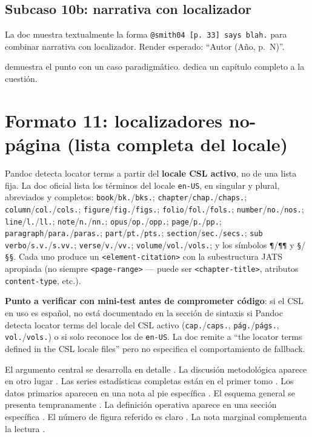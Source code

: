 \documentclass{article}
\begin{document}
\subsection{Subcaso 10b: narrativa con localizador}
La doc muestra textualmente la forma \texttt{@smith04 [p. 33] says blah.} para combinar narrativa con localizador. Render esperado: “Autor (Año, p. N)”.

\textcite[p. 33]{2961-KACZAN2016} demuestra el punto con un caso paradigmático. \textcite[pp. 12-18]{3036-ORBUCH2020} dedica un capítulo completo a la cuestión.



\section{Formato 11: localizadores no-página (lista completa del locale)}
Pandoc detecta locator terms a partir del \textbf{locale CSL activo}, no de una lista fija. La doc oficial lista los términos del locale \texttt{en-US}, en singular y plural, abreviados y completos: \texttt{book}/\texttt{bk.}/\texttt{bks.}; \texttt{chapter}/\texttt{chap.}/\texttt{chaps.}; \texttt{column}/\texttt{col.}/\texttt{cols.}; \texttt{figure}/\texttt{fig.}/\texttt{figs.}; \texttt{folio}/\texttt{fol.}/\texttt{fols.}; \texttt{number}/\texttt{no.}/\texttt{nos.}; \texttt{line}/\texttt{l.}/\texttt{ll.}; \texttt{note}/\texttt{n.}/\texttt{nn.}; \texttt{opus}/\texttt{op.}/\texttt{opp.}; \texttt{page}/\texttt{p.}/\texttt{pp.}; \texttt{paragraph}/\texttt{para.}/\texttt{paras.}; \texttt{part}/\texttt{pt.}/\texttt{pts.}; \texttt{section}/\texttt{sec.}/\texttt{secs.}; \texttt{sub verbo}/\texttt{s.v.}/\texttt{s.vv.}; \texttt{verse}/\texttt{v.}/\texttt{vv.}; \texttt{volume}/\texttt{vol.}/\texttt{vols.}; y los símbolos \texttt{¶}/\texttt{¶¶} y \texttt{§}/\texttt{§§}. Cada uno produce un \texttt{<element-citation>} con la subestructura JATS apropiada (no siempre \texttt{<page-range>} — puede ser \texttt{<chapter-title>}, atributos \texttt{content-type}, etc.).

\textbf{Punto a verificar con mini-test antes de comprometer código}: si el CSL en uso es español, no está documentado en la sección de sintaxis si Pandoc detecta locator terms del locale del CSL activo (\texttt{cap.}/\texttt{caps.}, \texttt{pág.}/\texttt{págs.}, \texttt{vol.}/\texttt{vols.}) o si solo reconoce los de \texttt{en-US}. La doc remite a “the locator terms defined in the CSL locale files” pero no especifica el comportamiento de fallback.

El argumento central se desarrolla en detalle \autocite[chap. 3]{3036-ORBUCH2020}. La discusión metodológica aparece en otro lugar \autocite[sec. 2.1]{3041-PINEAU1999}. Las series estadísticas completas están en el primer tomo \autocite[vol. 1, p. 45]{3036-ORBUCH2020}. Los datos primarios aparecen en una nota al pie específica \autocite[n. 12]{2961-KACZAN2016}. El esquema general se presenta tempranamente \autocite[pt. 1]{3036-ORBUCH2020}. La definición operativa aparece en una sección específica \autocite[sec. 4]{3041-PINEAU1999}. El número de figura referido es claro \autocite[fig. 7]{3036-ORBUCH2020}. La nota marginal complementa la lectura \autocite[¶ 5]{2961-KACZAN2016}.
\end{document}

